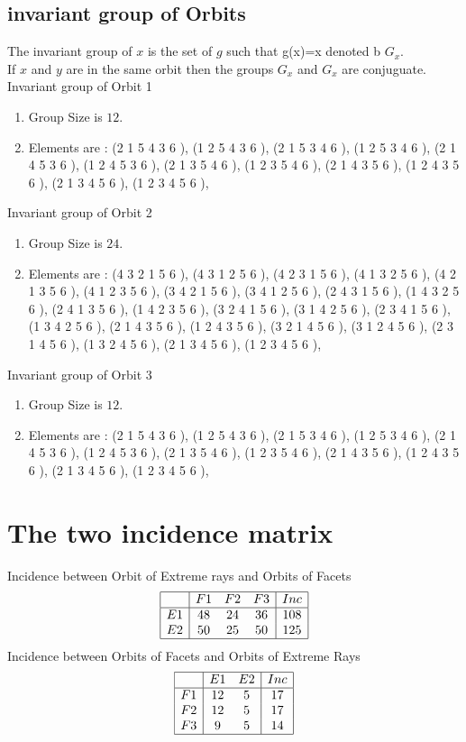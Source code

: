 \documentclass[12pt]{article}
\begin{document}
\subsection{invariant group of Orbits}
\noindent The invariant group of $x$ is the set of $g$ such that g(x)=x denoted b $G_x$.\\
If $x$ and $y$ are in the same orbit then the groups $G_x$ and  $G_x$ are conjuguate.\\
Invariant group of Orbit 1
\begin{enumerate}
\item Group Size is $12$.
\item Elements are : (2 1 5 4 3 6  ), (1 2 5 4 3 6  ), (2 1 5 3 4 6  ), (1 2 5 3 4 6  ), (2 1 4 5 3 6  ), (1 2 4 5 3 6  ), (2 1 3 5 4 6  ), (1 2 3 5 4 6  ), (2 1 4 3 5 6  ), (1 2 4 3 5 6  ), (2 1 3 4 5 6  ), (1 2 3 4 5 6  ), 
\end{enumerate}
Invariant group of Orbit 2
\begin{enumerate}
\item Group Size is $24$.
\item Elements are : (4 3 2 1 5 6  ), (4 3 1 2 5 6  ), (4 2 3 1 5 6  ), (4 1 3 2 5 6  ), (4 2 1 3 5 6  ), (4 1 2 3 5 6  ), (3 4 2 1 5 6  ), (3 4 1 2 5 6  ), (2 4 3 1 5 6  ), (1 4 3 2 5 6  ), (2 4 1 3 5 6  ), (1 4 2 3 5 6  ), (3 2 4 1 5 6  ), (3 1 4 2 5 6  ), (2 3 4 1 5 6  ), (1 3 4 2 5 6  ), (2 1 4 3 5 6  ), (1 2 4 3 5 6  ), (3 2 1 4 5 6  ), (3 1 2 4 5 6  ), (2 3 1 4 5 6  ), (1 3 2 4 5 6  ), (2 1 3 4 5 6  ), (1 2 3 4 5 6  ), 
\end{enumerate}
Invariant group of Orbit 3
\begin{enumerate}
\item Group Size is $12$.
\item Elements are : (2 1 5 4 3 6  ), (1 2 5 4 3 6  ), (2 1 5 3 4 6  ), (1 2 5 3 4 6  ), (2 1 4 5 3 6  ), (1 2 4 5 3 6  ), (2 1 3 5 4 6  ), (1 2 3 5 4 6  ), (2 1 4 3 5 6  ), (1 2 4 3 5 6  ), (2 1 3 4 5 6  ), (1 2 3 4 5 6  ), 
\end{enumerate}
\section{The two incidence matrix}
Incidence between Orbit of Extreme rays and Orbits of Facets
\begin{equation*}
\begin{array}{|c|ccc|c|}
\hline
&F1&F2&F3&Inc\\
\hline
E1&48&24&36&108\\
E2&50&25&50&125\\
\hline
\end{array}
\end{equation*}
Incidence between Orbits of Facets and Orbits of Extreme Rays
\begin{equation*}
\begin{array}{|c|cc|c|}
\hline
&E1&E2&Inc\\
\hline
F1&12&5&17\\
F2&12&5&17\\
F3&9&5&14\\
\hline
\end{array}
\end{equation*}
\end{document}
